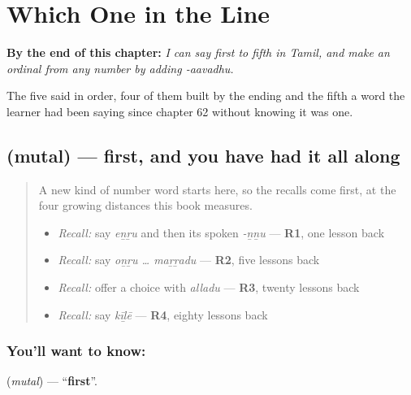 
\chapter{Which One in the Line}
\label{ch:ta-ordinals}

\begin{chapteropening}
\textbf{By the end of this chapter:} \emph{I can say first to fifth in Tamil, and make an ordinal from any number by adding -aavadhu.}

The five said in order, four of them built by the ending and the fifth a word the learner had been saying since chapter 62 without knowing it was one.
\end{chapteropening}

\section[\texorpdfstring{\ta{முதல்} (mutal)}{முதல் (mutal)}]{ (mutal) — first, and you have had it all along}

\label{lesson:TA-C82-first}



\begin{quote}
A new kind of number word starts here, so the recalls come first, at the four growing distances this book measures.

\begin{itemize}
\raggedright
  \item \emph{Recall:} say \emph{eṉṟu} and then its spoken \emph{-ṉṉu} — \textbf{R1}, one lesson back
  \item \emph{Recall:} say \emph{oṉṟu … maṟṟadu} — \textbf{R2}, five lessons back
  \item \emph{Recall:} offer a choice with \emph{alladu} — \textbf{R3}, twenty lessons back
  \item \emph{Recall:} say \emph{kīḻē} — \textbf{R4}, eighty lessons back
\end{itemize}
\end{quote}

\subsection*{You'll want to know: }
\textbf{} (\emph{mutal}) — \textquotedblleft{}\textbf{first}\textquotedblright{}.

